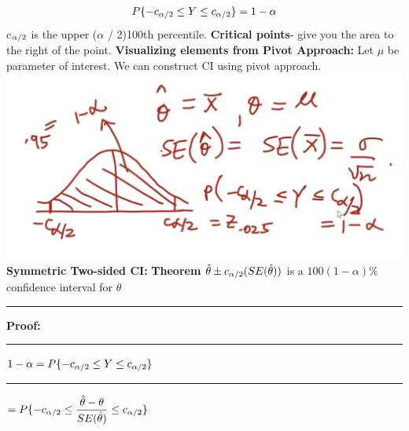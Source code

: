 \documentclass[]{article}
\begin{document}
\[  P \{ -c_{\alpha \\/ 2} \le Y \le c_{\alpha \\/ 2}  \}   = 1 - \alpha  \] 
c$_{\alpha \\/ 2}$ is the upper ($\alpha$ / 2)100th percentile.
\newline
\newline \textbf{Critical points}- give you the area to the right of the point. \newline
\newline\textbf{Visualizing elements from Pivot Approach:}
\newline Let $\mu$ be parameter of interest. We can construct CI using pivot approach.
\newline
\includegraphics[scale=0.6]{general_ci_example}
\newline
\newline
\newline 
\newline
\newline
\Large\textbf{Symmetric Two-sided CI:}
\Large\textbf{Theorem}
\newline $ \hat\theta \pm c_{\alpha \\/ 2}(SE(\hat\theta))$ is a $100(1-\alpha)\%$ confidence interval for $\theta$
\newline 
\newline\Large\rule{3.0cm}{0pt} \textbf{Proof:}
\newline\Large\rule{3.0cm}{0pt}  $ 1 - \alpha =  P \{ -c_{\alpha \\/ 2} \le Y \le c_{\alpha \\/ 2}  \}$
\newline
\newline\Large\rule{4.3cm}{0pt}  $=  P \{ -c_{\alpha \\/ 2} \le \dfrac{\hat{\theta} - \theta}{ SE(\hat{\theta})}  \le c_{\alpha \\/ 2}  \}$
\newline
\end{document}
